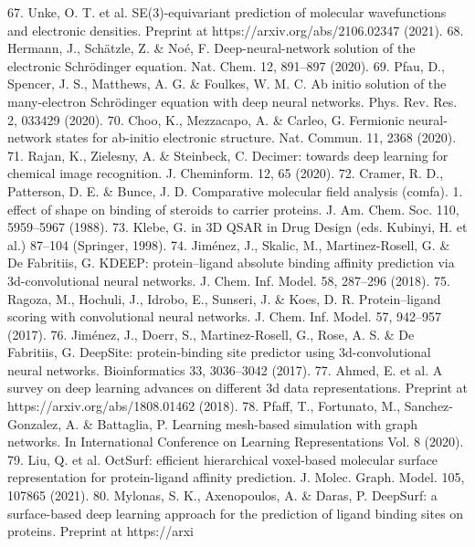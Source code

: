 	67.
Unke, O. T. et al. SE(3)-equivariant prediction of molecular wavefunctions
and electronic densities. Preprint at https://arxiv.org/abs/2106.02347 (2021).
	68.
Hermann, J., Schätzle, Z. \& Noé, F. Deep-neural-network solution of the
electronic Schrödinger equation. Nat. Chem. 12, 891–897 (2020).
	69.
Pfau, D., Spencer, J. S., Matthews, A. G. \& Foulkes, W. M. C. Ab initio
solution of the many-electron Schrödinger equation with deep neural
networks. Phys. Rev. Res. 2, 033429 (2020).
	70.
Choo, K., Mezzacapo, A. \& Carleo, G. Fermionic neural-network states for
ab-initio electronic structure. Nat. Commun. 11, 2368 (2020).
	71.
Rajan, K., Zielesny, A. \& Steinbeck, C. Decimer: towards deep learning for
chemical image recognition. J. Cheminform. 12, 65 (2020).
	72.
Cramer, R. D., Patterson, D. E. \& Bunce, J. D. Comparative molecular field
analysis (comfa). 1. effect of shape on binding of steroids to carrier
proteins. J. Am. Chem. Soc. 110, 5959–5967 (1988).
	73.
Klebe, G. in 3D QSAR in Drug Design (eds. Kubinyi, H. et al.) 87–104
(Springer, 1998).
	74.
Jiménez, J., Skalic, M., Martinez-Rosell, G. \& De Fabritiis, G. KDEEP:
protein–ligand absolute binding affinity prediction via 3d-convolutional
neural networks. J. Chem. Inf. Model. 58, 287–296 (2018).
	75.
Ragoza, M., Hochuli, J., Idrobo, E., Sunseri, J. \& Koes, D. R. Protein–ligand
scoring with convolutional neural networks. J. Chem. Inf. Model. 57,
942–957 (2017).
	76.
Jiménez, J., Doerr, S., Martinez-Rosell, G., Rose, A. S. \& De Fabritiis, G.
DeepSite: protein-binding site predictor using 3d-convolutional neural
networks. Bioinformatics 33, 3036–3042 (2017).
	77.
Ahmed, E. et al. A survey on deep learning advances on different 3d data
representations. Preprint at https://arxiv.org/abs/1808.01462 (2018).
	78.
Pfaff, T., Fortunato, M., Sanchez-Gonzalez, A. \& Battaglia, P. Learning
mesh-based simulation with graph networks. In International Conference on
Learning Representations Vol. 8 (2020).
	79.
Liu, Q. et al. OctSurf: efficient hierarchical voxel-based molecular surface
representation for protein-ligand affinity prediction. J. Molec. Graph. Model.
105, 107865 (2021).
	80.
Mylonas, S. K., Axenopoulos, A. \& Daras, P. DeepSurf: a surface-based
deep learning approach for the prediction of ligand binding sites on
proteins. Preprint at https://arxi

